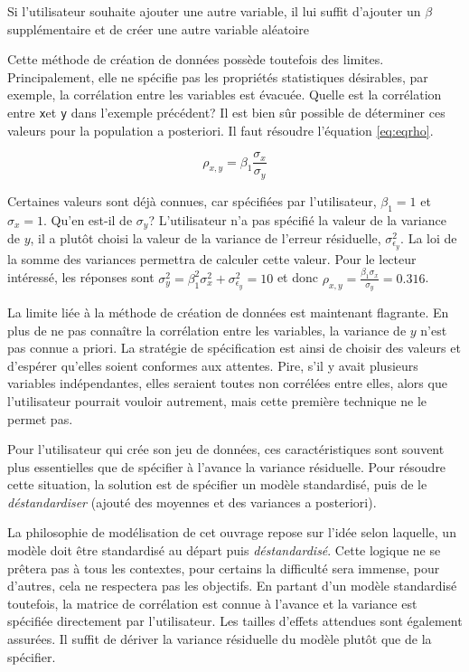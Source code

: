 \documentclass[
]{book}
\begin{document}
Si l'utilisateur souhaite ajouter une autre variable, il lui suffit d'ajouter un \(\beta\) supplémentaire et de créer une autre variable aléatoire

Cette méthode de création de données possède toutefois des limites. Principalement, elle ne spécifie pas les propriétés statistiques désirables, par exemple, la corrélation entre les variables est évacuée. Quelle est la corrélation entre \texttt{x}et \texttt{y} dans l'exemple précédent? Il est bien sûr possible de déterminer ces valeurs pour la population a posteriori. Il faut résoudre l'équation \eqref{eq:eqrho}.

\begin{equation}
\rho_{x,y} = \beta_1 \frac{\sigma_x}{\sigma_y} 
\label{eq:eqrho}
\end{equation}

Certaines valeurs sont déjà connues, car spécifiées par l'utilisateur, \(\beta_1 = 1\) et \(\sigma_x = 1\). Qu'en est-il de \(\sigma_y\)? L'utilisateur n'a pas spécifié la valeur de la variance de \(y\), il a plutôt choisi la valeur de la variance de l'erreur résiduelle, \(\sigma^2_{\epsilon_y}\). La loi de la somme des variances permettra de calculer cette valeur. Pour le lecteur intéressé, les réponses sont \(\sigma^2_y = \beta_1^2\sigma^2_x+\sigma^2_{\epsilon_y} = 10\) et donc \(\rho_{x,y} = \frac{\beta_1 \sigma_x}{\sigma_y} = 0.316\).

La limite liée à la méthode de création de données est maintenant flagrante. En plus de ne pas connaître la corrélation entre les variables, la variance de \(y\) n'est pas connue a priori. La stratégie de spécification est ainsi de choisir des valeurs et d'espérer qu'elles soient conformes aux attentes. Pire, s'il y avait plusieurs variables indépendantes, elles seraient toutes non corrélées entre elles, alors que l'utilisateur pourrait vouloir autrement, mais cette première technique ne le permet pas.

Pour l'utilisateur qui crée son jeu de données, ces caractéristiques sont souvent plus essentielles que de spécifier à l'avance la variance résiduelle. Pour résoudre cette situation, la solution est de spécifier un modèle standardisé, puis de le \emph{déstandardiser} (ajouté des moyennes et des variances a posteriori).

La philosophie de modélisation de cet ouvrage repose sur l'idée selon laquelle, un modèle doit être standardisé au départ puis \emph{déstandardisé}. Cette logique ne se prêtera pas à tous les contextes, pour certains la difficulté sera immense, pour d'autres, cela ne respectera pas les objectifs. En partant d'un modèle standardisé toutefois, la matrice de corrélation est connue à l'avance et la variance est spécifiée directement par l'utilisateur. Les tailles d'effets attendues sont également assurées. Il suffit de dériver la variance résiduelle du modèle plutôt que de la spécifier.
\end{document}
